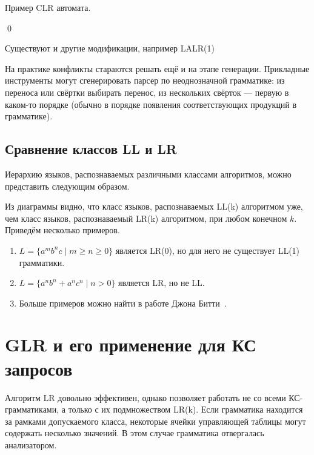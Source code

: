 \begin{example}
Пример CLR автомата.

\begin{center}
  
\end{center}
\qed
\end{example}


Существуют и другие модификации, например LALR(1)

На практике конфликты стараются решать ещё и на этапе генерации.
Прикладные инструменты могут сгенерировать парсер по неоднозначной грамматике: из переноса или свёртки выбирать перенос, из нескольких свёрток --- первую в каком-то порядке (обычно в порядке появления соответствующих продукций в грамматике).

\subsection{Сравнение классов LL и LR}

Иерархию языков, распознаваемых различными классами алгоритмов, можно представить следующим  образом.

\begin{center}
  
\end{center}

Из диаграммы видно, что класс языков, распознаваемых LL(k) алгоритмом уже, чем класс языков, распознаваемый LR(k) алгоритмом, при любом конечном $k$. Приведём несколько примеров.
\begin{enumerate}
\item $L = \{a^mb^nc \mid m \geq n \geq 0\} $ является LR(0), но для него не существует LL(1) грамматики.
\item $L = \{ a^n b^n + a^n c^n \mid n > 0\}$ является LR, но не LL.
\item Больше примеров можно найти в работе Джона Битти~\cite{BEATTY1980193}.
\end{enumerate}

\section{GLR и его применение для КС запросов}

Алгоритм LR довольно эффективен, однако позволяет работать не со всеми КС-грамматиками, а только с их подмножеством LR(k). Если грамматика находится за рамками допускаемого класса, некоторые ячейки управляющей таблицы могут содержать несколько значений. В этом случае грамматика отвергалась анализатором.

